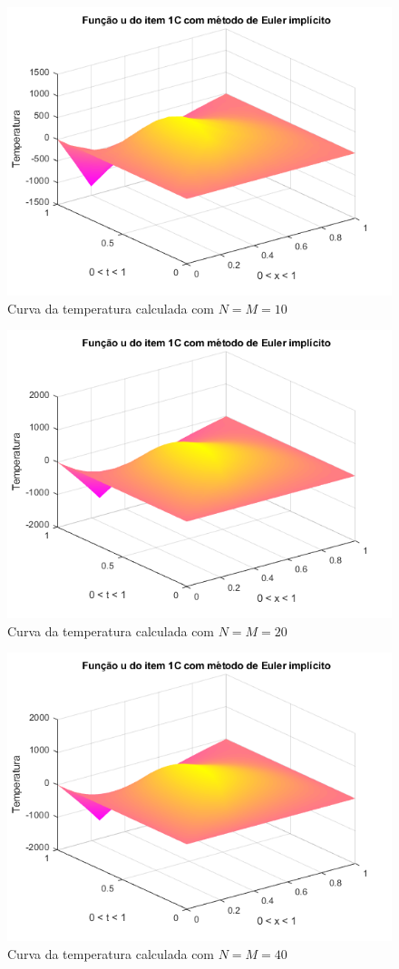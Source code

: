 \documentclass[12pt]{article}
\begin{document}
\begin{spacing}{1.5}
\begin{figure}
    \centering
    \includegraphics[width=0.8\linewidth]{Segunda_Tarefa/ItemB/nm10_calculada_C.png}
    \caption{Curva da temperatura calculada com $N=M=10$}
    \label{fig:BC_nm10_calculada}
\end{figure}

\begin{figure}
    \centering
    \includegraphics[width=0.8\linewidth]{Segunda_Tarefa/ItemB/nm20_calculada_C.png}
    \caption{Curva da temperatura calculada com $N=M=20$}
    \label{fig:BC_nm20_calculada}
\end{figure}

\begin{figure}
    \centering
    \includegraphics[width=0.8\linewidth]{Segunda_Tarefa/ItemB/nm40_calculada_C.png}
    \caption{Curva da temperatura calculada com $N=M=40$}
    \label{fig:BC_nm40_calculada}
\end{figure}


\end{spacing}
\end{document}
